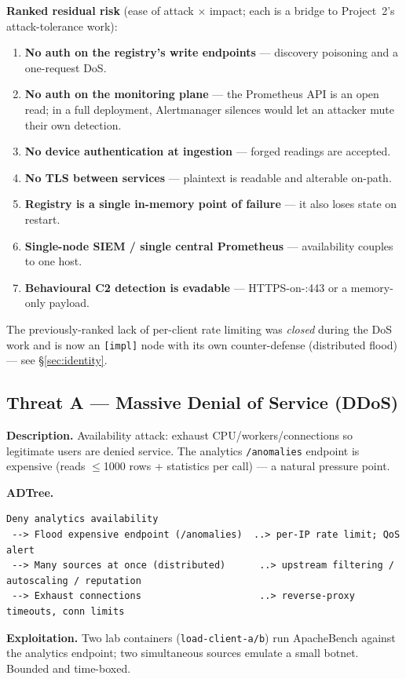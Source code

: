 \documentclass[11pt,a4paper]{article}
\newcommand{\code}[1]{\texttt{\small #1}}
\begin{document}
\noindent\textbf{Ranked residual risk} (ease of attack $\times$ impact; each is a bridge to
Project~2's attack-tolerance work):
\begin{enumerate}[label=\arabic*.]
  \item \textbf{No auth on the registry's write endpoints} --- discovery poisoning and a
        one-request DoS.
  \item \textbf{No auth on the monitoring plane} --- the Prometheus API is an open read; in a full
        deployment, Alertmanager silences would let an attacker mute their own detection.
  \item \textbf{No device authentication at ingestion} --- forged readings are accepted.
  \item \textbf{No TLS between services} --- plaintext is readable and alterable on-path.
  \item \textbf{Registry is a single in-memory point of failure} --- it also loses state on restart.
  \item \textbf{Single-node SIEM / single central Prometheus} --- availability couples to one host.
  \item \textbf{Behavioural C2 detection is evadable} --- HTTPS-on-:443 or a memory-only payload.
\end{enumerate}
The previously-ranked lack of per-client rate limiting was \emph{closed} during the DoS work and is
now an \code{[impl]} node with its own counter-defense (distributed flood) --- see
\S\ref{sec:identity}.

\subsection{Threat A --- Massive Denial of Service (DDoS)}\label{sec:t1}
\textbf{Description.} Availability attack: exhaust CPU/workers/connections so legitimate users are
denied service. The analytics \code{/anomalies} endpoint is expensive (reads $\le$1000 rows +
statistics per call) --- a natural pressure point.

\noindent\textbf{ADTree.}
\begin{lstlisting}
Deny analytics availability
 --> Flood expensive endpoint (/anomalies)  ..> per-IP rate limit; QoS alert
 --> Many sources at once (distributed)      ..> upstream filtering / autoscaling / reputation
 --> Exhaust connections                     ..> reverse-proxy timeouts, conn limits
\end{lstlisting}

\noindent\textbf{Exploitation.} Two lab containers (\code{load-client-a/b}) run ApacheBench against
the analytics endpoint; two simultaneous sources emulate a small botnet. Bounded and time-boxed.
\end{document}
